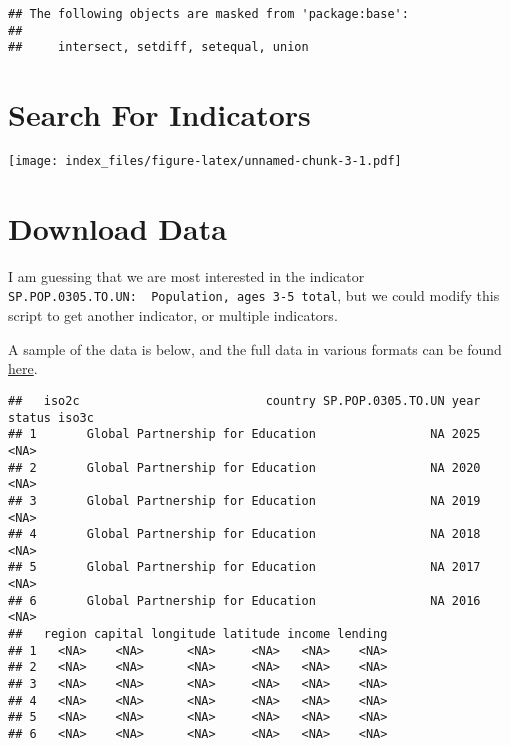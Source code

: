 \documentclass[
]{article}
\begin{document}
\begin{verbatim}
## The following objects are masked from 'package:base':
## 
##     intersect, setdiff, setequal, union
\end{verbatim}

\hypertarget{search-for-indicators}{%
\section{Search For Indicators}\label{search-for-indicators}}

\texttt{[image: index\_files/figure-latex/unnamed-chunk-3-1.pdf]}

\hypertarget{download-data}{%
\section{Download Data}\label{download-data}}

I am guessing that we are most interested in the indicator
\texttt{SP.POP.0305.TO.UN:\ \ Population,\ ages\ 3-5\ total}, but we
could modify this script to get another indicator, or multiple
indicators.

A sample of the data is below, and the full data in various formats can
be found \href{./}{here}.

\begin{verbatim}
##   iso2c                          country SP.POP.0305.TO.UN year status iso3c
## 1       Global Partnership for Education                NA 2025         <NA>
## 2       Global Partnership for Education                NA 2020         <NA>
## 3       Global Partnership for Education                NA 2019         <NA>
## 4       Global Partnership for Education                NA 2018         <NA>
## 5       Global Partnership for Education                NA 2017         <NA>
## 6       Global Partnership for Education                NA 2016         <NA>
##   region capital longitude latitude income lending
## 1   <NA>    <NA>      <NA>     <NA>   <NA>    <NA>
## 2   <NA>    <NA>      <NA>     <NA>   <NA>    <NA>
## 3   <NA>    <NA>      <NA>     <NA>   <NA>    <NA>
## 4   <NA>    <NA>      <NA>     <NA>   <NA>    <NA>
## 5   <NA>    <NA>      <NA>     <NA>   <NA>    <NA>
## 6   <NA>    <NA>      <NA>     <NA>   <NA>    <NA>
\end{verbatim}
\end{document}
